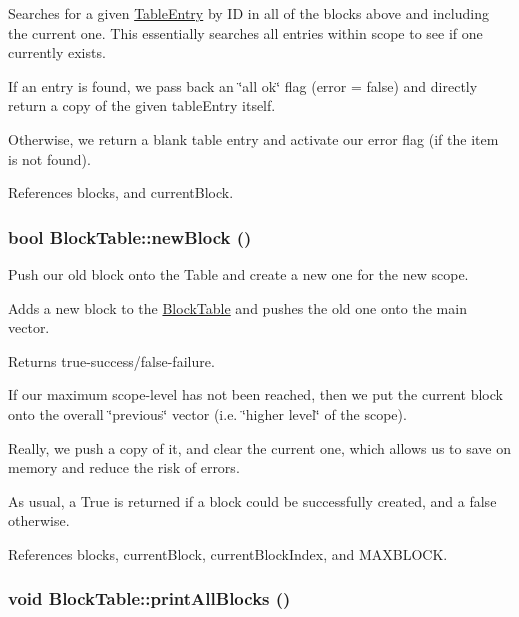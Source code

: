 Searches for a given \hyperlink{structTableEntry}{TableEntry} by ID in all of the blocks above and including the current one. This essentially searches all entries within scope to see if one currently exists.

If an entry is found, we pass back an \char`\"{}all ok\char`\"{} flag (error = false) and directly return a copy of the given tableEntry itself.

Otherwise, we return a blank table entry and activate our error flag (if the item is not found). 

References blocks, and currentBlock.

\hypertarget{classBlockTable_a6bdc70c8ad8a670f510803dc7df162ef}{
\subsubsection[{newBlock}]{\setlength{\rightskip}{0pt plus 5cm}bool BlockTable::newBlock ()}}
\label{classBlockTable_a6bdc70c8ad8a670f510803dc7df162ef}


Push our old block onto the Table and create a new one for the new scope. 

Adds a new block to the \hyperlink{classBlockTable}{BlockTable} and pushes the old one onto the main vector.

Returns true-\/success/false-\/failure.

If our maximum scope-\/level has not been reached, then we put the current block onto the overall \char`\"{}previous\char`\"{} vector (i.e. \char`\"{}higher level\char`\"{} of the scope).

Really, we push a copy of it, and clear the current one, which allows us to save on memory and reduce the risk of errors.

As usual, a True is returned if a block could be successfully created, and a false otherwise. 

References blocks, currentBlock, currentBlockIndex, and MAXBLOCK.

\hypertarget{classBlockTable_af1f2d9c57b11b3cf7f55b31021d85c88}{
\subsubsection[{printAllBlocks}]{\setlength{\rightskip}{0pt plus 5cm}void BlockTable::printAllBlocks ()}}
\label{classBlockTable_af1f2d9c57b11b3cf7f55b31021d85c88}


